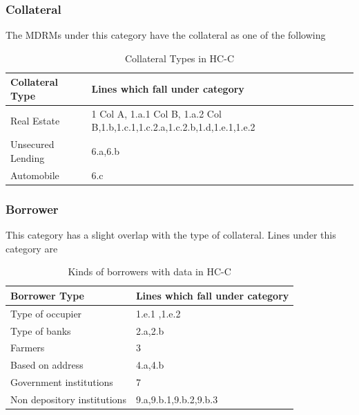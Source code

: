 \documentclass[conference]{IEEEtran}
\begin{document}
     \subsubsection{Collateral}
            The MDRMs under this category have the collateral as one of the following
             \begin{table}[htbp]
            	\centering
            	\caption{Collateral Types in HC-C}
            	\begin{tabular}{|p{1.5cm}|p{6cm}|}
            		\hline
            		\textbf{Collateral Type} & \textbf{Lines which fall under category} \\
            		\hline
            		Real Estate & 1 Col A, 1.a.1 Col B, 1.a.2 Col B,1.b,1.c.1,1.c.2.a,1.c.2.b,1.d,1.e.1,1.e.2 \\
            		\hline
            		Unsecured Lending & 6.a,6.b \\
            		\hline
            		Automobile & 6.c \\
            		\hline
            	\end{tabular}
            \end{table}
      
      \subsubsection{Borrower}
            This category has a slight overlap with the type of collateral. Lines under this category are
            \begin{table}[htbp]
            	\centering
            	\caption{Kinds of borrowers with data in HC-C}
            	\begin{tabular}{|p{3.5cm}|p{4cm}|}
            		\hline
            		\textbf{Borrower Type} & \textbf{Lines which fall under category} \\
            		\hline
            		Type of occupier & 1.e.1 ,1.e.2 \\
            		\hline
            		Type of banks & 2.a,2.b \\
            		\hline
            		Farmers & 3 \\
            		\hline
            		Based on address & 4.a,4.b\\
            		\hline
            		Government institutions&7\\
            		\hline
            		Non depository institutions&9.a,9.b.1,9.b.2,9.b.3\\
            		\hline
            		\end{tabular}
            \end{table}
\end{document}
